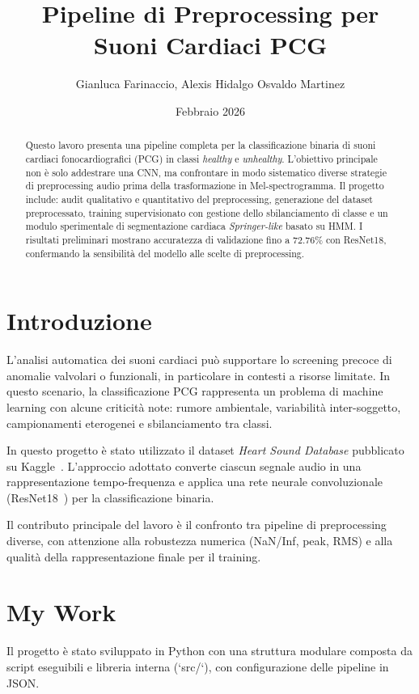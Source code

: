\documentclass[a4paper,11pt]{article}
\title{ Pipeline di Preprocessing per Suoni Cardiaci PCG}
\author{Gianluca Farinaccio, Alexis Hidalgo Osvaldo Martinez}
\date{Febbraio 2026}
\begin{document}
\maketitle

\begin{abstract}
Questo lavoro presenta una pipeline completa per la classificazione binaria di suoni cardiaci fonocardiografici (PCG) in classi \emph{healthy} e \emph{unhealthy}. L'obiettivo principale non è solo addestrare una CNN, ma confrontare in modo sistematico diverse strategie di preprocessing audio prima della trasformazione in Mel-spectrogramma. Il progetto include: audit qualitativo e quantitativo del preprocessing, generazione del dataset preprocessato, training supervisionato con gestione dello sbilanciamento di classe e un modulo sperimentale di segmentazione cardiaca \emph{Springer-like} basato su HMM. I risultati preliminari mostrano accuratezza di validazione fino a $72.76\%$ con ResNet18, confermando la sensibilità del modello alle scelte di preprocessing.
\end{abstract}

\section{Introduzione}
L'analisi automatica dei suoni cardiaci può supportare lo screening precoce di anomalie valvolari o funzionali, in particolare in contesti a risorse limitate. In questo scenario, la classificazione PCG rappresenta un problema di machine learning con alcune criticità note: rumore ambientale, variabilità inter-soggetto, campionamenti eterogenei e sbilanciamento tra classi.

In questo progetto è stato utilizzato il dataset \emph{Heart Sound Database} pubblicato su Kaggle~\cite{heartsoundkaggle}. L'approccio adottato converte ciascun segnale audio in una rappresentazione tempo-frequenza e applica una rete neurale convoluzionale (ResNet18~\cite{he2016resnet}) per la classificazione binaria.

Il contributo principale del lavoro è il confronto tra pipeline di preprocessing diverse, con attenzione alla robustezza numerica (NaN/Inf, peak, RMS) e alla qualità della rappresentazione finale per il training.

\section{My Work}
Il progetto è stato sviluppato in Python con una struttura modulare composta da script eseguibili e libreria interna (`src/`), con configurazione delle pipeline in JSON.
\end{document}
